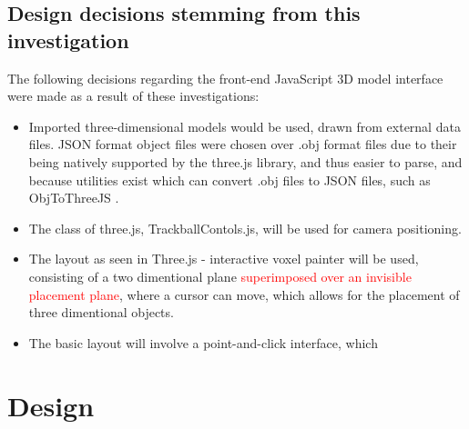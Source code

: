 \subsection{Design decisions stemming from this investigation}
\label{subSec: Three.js: Design decisions stemming from this investigation}

The following decisions regarding the front-end JavaScript 3D model interface were made as a result of these investigations:

\begin{itemize}
\item Imported three-dimensional models would be used, drawn from external data files. JSON format object files were chosen over .obj format files due to their being natively supported by the three.js library, and thus easier to parse, and because utilities exist which can convert .obj files to JSON files, such as Obj\textunderscore To\textunderscore ThreeJS \cite{ObjToJSON}.

\item The class of three.js, TrackballContols.js, will be used for camera positioning.

\item The layout as seen in Three.js - interactive voxel painter \cite{ThreeJSVoxelPainter} will be used, consisting of a two dimentional plane \textcolor{red}{superimposed over an invisible placement plane}, where a cursor can move, which allows for the placement of three dimentional objects.

\item The basic layout will involve a point-and-click interface, which  
\end{itemize}

\section{Design}
\label{sec:Design}































